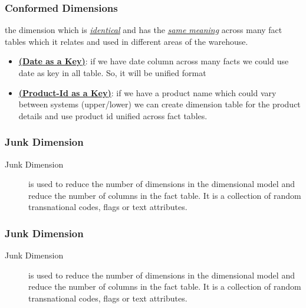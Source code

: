 \begin{frame}
    \frametitle{Conformed Dimensions}
    \begin{description}[<+->]
        \item[Conformed Dimensions]    the dimension which is \underline{\textit{identical}} and has the \underline{\textit{same meaning}} across many fact tables which it relates and used in different areas of the warehouse.
        \begin{example}
            \begin{itemize}[<+->]
                \item \underline{\textbf{(Date as a Key)}}: if we have date column across many facts we could use date as key in all table.
                So, it will be unified format
                \item \underline{\textbf{(Product-Id as a Key)}}: if we have a product name which could vary between systems
                \faEdit \space \faArrowCircleORight \space (upper/lower) we can create dimension table for the product details and use product id unified across fact tables.
            \end{itemize}
        \end{example}
    \end{description}
\end{frame}
\begin{frame}
    \frametitle{Junk Dimension}
    \begin{description}
        \item[Junk Dimension] is used to reduce the number of dimensions in the dimensional model and reduce the number of columns in the fact table. It is a collection of random transnational codes, flags or text attributes.
    \end{description}
\end{frame}
\begin{frame}
    \frametitle{Junk Dimension}
    \begin{description}
        \item[Junk Dimension] is used to reduce the number of dimensions in the dimensional model and reduce the number of columns in the fact table. It is a collection of random transnational codes, flags or text attributes.
    \end{description}
    
\end{frame}

